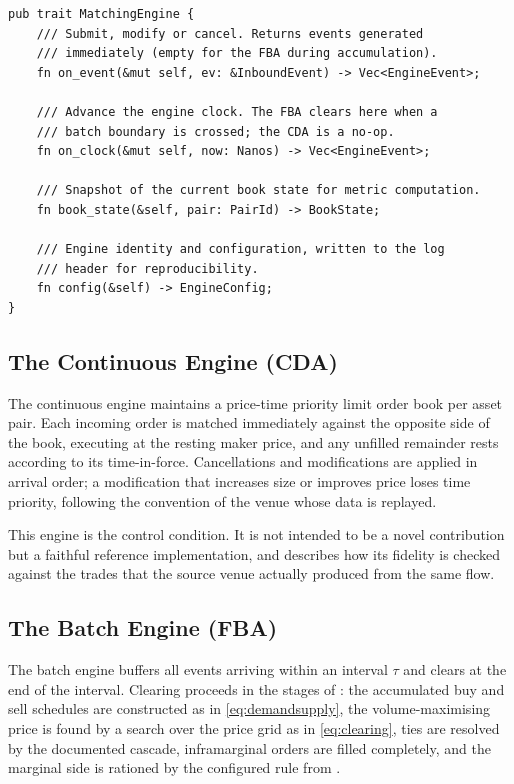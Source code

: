 \begin{lstlisting}[caption={The shared matching interface. Both engines
implement the same trait, so the harness is generic over the
mechanism.},label={lst:trait}]
pub trait MatchingEngine {
    /// Submit, modify or cancel. Returns events generated
    /// immediately (empty for the FBA during accumulation).
    fn on_event(&mut self, ev: &InboundEvent) -> Vec<EngineEvent>;

    /// Advance the engine clock. The FBA clears here when a
    /// batch boundary is crossed; the CDA is a no-op.
    fn on_clock(&mut self, now: Nanos) -> Vec<EngineEvent>;

    /// Snapshot of the current book state for metric computation.
    fn book_state(&self, pair: PairId) -> BookState;

    /// Engine identity and configuration, written to the log
    /// header for reproducibility.
    fn config(&self) -> EngineConfig;
}
\end{lstlisting}

\subsection{The Continuous Engine (CDA)}

The continuous engine maintains a price-time priority limit order book
per asset pair. Each incoming order is matched immediately against the
opposite side of the book, executing at the resting maker price, and any
unfilled remainder rests according to its time-in-force. Cancellations
and modifications are applied in arrival order; a modification that
increases size or improves price loses time priority, following the
convention of the venue whose data is replayed.

This engine is the control condition. It is not intended to be a novel
contribution but a faithful reference implementation, and
 describes how its fidelity is checked against the
trades that the source venue actually produced from the same flow.

\subsection{The Batch Engine (FBA)}

The batch engine buffers all events arriving within an interval $\tau$
and clears at the end of the interval. Clearing proceeds in the stages
of : the accumulated buy and sell schedules are
constructed as in \eqref{eq:demandsupply}, the volume-maximising price
is found by a search over the price grid as in \eqref{eq:clearing}, ties
are resolved by the documented cascade, inframarginal orders are filled
completely, and the marginal side is rationed by the configured rule
from .

